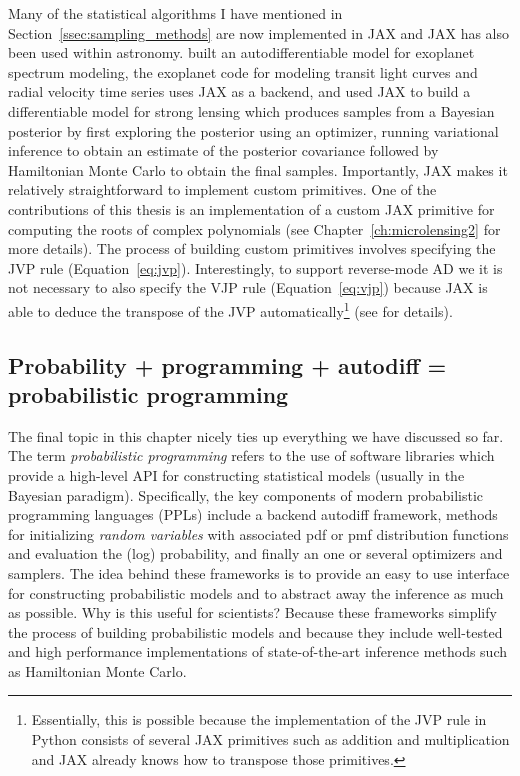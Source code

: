\documentclass[12pt,dvipsnames]{report}
\begin{document}
Many of the statistical algorithms I have mentioned  in 
Section~\ref{ssec:sampling_methods} are now implemented in \textsf{JAX} and 
\textsf{JAX} has also been used within astronomy. \citet{2022ApJS..258...31K} built 
an autodifferentiable model for exoplanet spectrum modeling, 
the \textsf{exoplanet} code \citet{2021JOSS....6.3285F} for modeling transit light 
curves and radial velocity time series uses \textsf{JAX} as a backend, and 
\citet{2022arXiv220207663G} used \textsf{JAX} to build a differentiable model 
for strong lensing  which produces samples from a Bayesian posterior by  first
exploring the posterior using an optimizer, running variational inference to 
obtain an estimate of the posterior covariance followed by Hamiltonian Monte Carlo
to obtain the final samples. Importantly, \textsf{JAX} makes it relatively 
straightforward to implement custom primitives. One of the contributions of this 
thesis is an implementation of a custom JAX primitive for computing the roots 
of complex polynomials (see Chapter~\ref{ch:microlensing2} for more details).
The process of building custom primitives involves specifying the JVP rule 
(Equation~\ref{eq:jvp}). Interestingly, to support reverse-mode AD we it is 
not necessary to also specify the VJP rule (Equation~\ref{eq:vjp}) because 
\textsf{JAX} is able to deduce the transpose of the JVP automatically\footnote{
    Essentially, this is possible because the implementation of the JVP rule 
    in \textsf{Python} consists of several \textsf{JAX} primitives such as addition
    and multiplication and \textsf{JAX} already knows how to transpose those 
    primitives.} (see \citet{arXiv:2105.09469} for details). 

\subsection{Probability + programming + autodiff = probabilistic programming}
The final topic in this chapter nicely ties up everything we have discussed so far.
The term \textsl{probabilistic programming} refers to the use of software libraries 
which  provide a high-level API for constructing statistical models (usually in 
the Bayesian paradigm). Specifically, 
the key components of modern probabilistic programming languages (PPLs) include a backend
autodiff framework, methods for initializing \emph{random variables} with 
associated pdf or pmf distribution functions and evaluation the (log) probability, 
and finally an one or several optimizers and samplers. The idea behind these 
frameworks is to provide an easy to use interface for constructing probabilistic 
models and to abstract away the inference as much as possible.
Why is this useful for scientists? Because these frameworks simplify the process  
of building probabilistic  models and because they include well-tested and high
performance implementations of state-of-the-art inference methods such as 
Hamiltonian Monte Carlo. 
\end{document}
